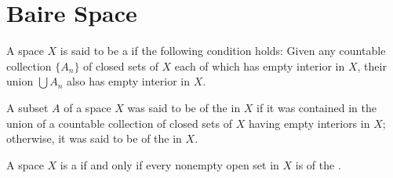 \documentclass[../main.tex]{subfiles}
\begin{document}
\ifSubfilesClassLoaded{

    
}{}

\chapter{ Baire Space }

\begin{definition}{}{}
A space $X$ is said to be a  if the following condition holds:
Given any countable collection $\{A_n\}$ of closed sets of $X$ each of which has empty interior in $X$, their union $\bigcup A_n$ also has empty interior in $X$.
\end{definition}

\begin{definition}{}{}
  A subset $A$ of a space $X$ was said to be of the  in $X$ if it was contained in the union of a countable collection of closed sets of $X$ having empty interiors in $X$; otherwise, it was said to be of the  in $X$. 
\end{definition}

\begin{theorem}{}{}
    A space $X$ is a  if and only if every nonempty open set in $X$ is of the .
\end{theorem}
\end{document}
